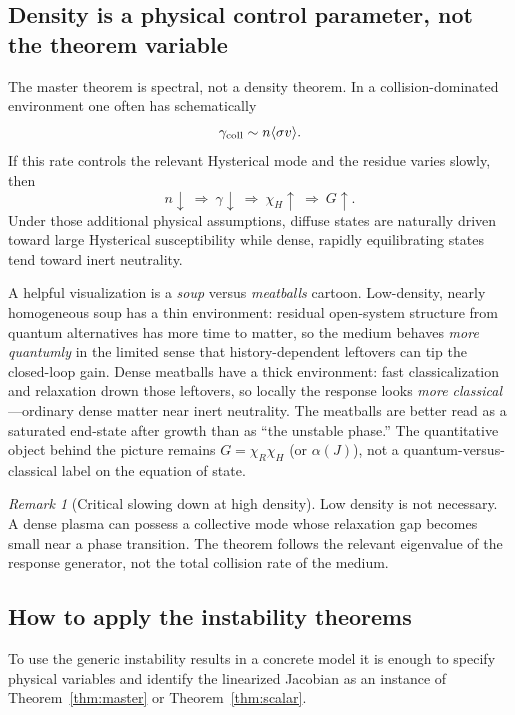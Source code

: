 \documentclass[11pt]{article}
\theoremstyle{definition}
\theoremstyle{remark}
\newtheorem{remark}[theorem]{Remark}
\begin{document}
\subsection{Density is a physical control parameter, not the theorem variable}
The master theorem is spectral, not a density theorem.  In a collision-dominated environment one often has schematically
\begin{equation}
 \gamma_{\rm coll}\sim n\langle\sigma v\rangle.
\end{equation}
If this rate controls the relevant Hysterical mode and the residue varies slowly, then
\begin{equation}
 n\downarrow\ \Longrightarrow\ \gamma\downarrow\ \Longrightarrow\
 \chi_H\uparrow\ \Longrightarrow\ G\uparrow.
\end{equation}
Under those additional physical assumptions, diffuse states are naturally driven toward large Hysterical susceptibility while dense, rapidly equilibrating states tend toward inert neutrality.

A helpful visualization is a \emph{soup} versus \emph{meatballs} cartoon.
Low-density, nearly homogeneous soup has a thin environment: residual open-system structure from quantum alternatives has more time to matter, so the medium behaves \emph{more quantumly} in the limited sense that history-dependent leftovers can tip the closed-loop gain.
Dense meatballs have a thick environment: fast classicalization and relaxation drown those leftovers, so locally the response looks \emph{more classical}---ordinary dense matter near inert neutrality.
The meatballs are better read as a saturated end-state after growth than as ``the unstable phase.''
The quantitative object behind the picture remains $G=\chi_R\chi_H$ (or $\alpha(J)$), not a quantum-versus-classical label on the equation of state.

\begin{remark}[Critical slowing down at high density]
Low density is not necessary.  A dense plasma can possess a collective mode whose relaxation gap becomes small near a phase transition.  The theorem follows the relevant eigenvalue of the response generator, not the total collision rate of the medium.
\end{remark}

\subsection{How to apply the instability theorems}
To use the generic instability results in a concrete model it is enough to specify physical variables and identify the linearized Jacobian as an instance of Theorem~\ref{thm:master} or Theorem~\ref{thm:scalar}.
\end{document}
